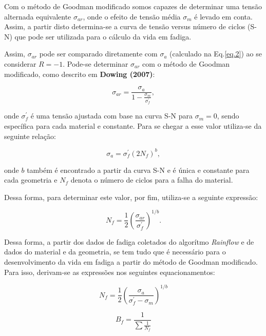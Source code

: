 Com o método de Goodman modificado somos capazes de determinar uma tensão alternada equivalente $\sigma_{ar}$, onde o efeito de tensão média $\sigma_{m}$ é levado em conta. Assim, a partir disto determina-se a curva de tensão versus número de ciclos (S-N) que pode ser utilizada para o cálculo da vida em fadiga.

Assim, $\sigma_{ar}$ pode ser comparado diretamente com $\sigma_{a}$ (calculado na Eq.\ref{eq.2}) ao se considerar $R = -1$. Pode-se determinar $\sigma_{ar}$ com o método de Goodman modificado, como descrito em \textbf{Dowing (2007)}:

\begin{equation}
    \sigma_{ar} = \frac{\sigma_a}{1 - \frac{\sigma_m}{\sigma_f^\prime}},
\end{equation}

onde $\sigma_f^\prime$ é uma tensão ajustada com base na curva S-N para $\sigma_m = 0$, sendo específica para cada material e constante. Para se chegar a esse valor utiliza-se da seguinte relação:

\begin{equation}
    \sigma_a = \sigma_f^\prime \left( 2 N_f \right)^{b},
\end{equation}

onde $b$ também é encontrado a partir da curva S-N e é única e constante para cada geometria e $N_f$ denota o número de ciclos para a falha do material.

Dessa forma, para determinar este valor, por fim, utiliza-se a seguinte expressão:


\begin{equation}
    N_f = \frac{1}{2} \left( \frac{\sigma_{ar}}{\sigma_f^\prime}  \right)^{1/b}.
\end{equation}

Dessa forma, a partir dos dados  de fadiga coletados do algorítmo \emph{Rainflow} e de dados do material e da geometria, se tem tudo que é necessário para o desenvolvimento da vida em fadiga a partir do método de Goodman modificado. Para isso, derivam-se as expressões nos seguintes equacionamentos:

\begin{equation}
    N_f = \frac{1}{2} \left( \frac{\sigma_a}{\sigma^\prime_f - \sigma_m } \right)^{1/b}
\end{equation}

\begin{equation}
    B_f = \frac{1}{\sum \frac{1}{N_f}}
\end{equation}

